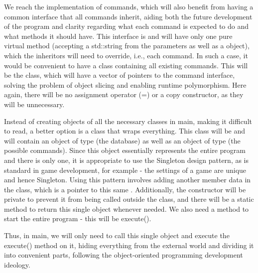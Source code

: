We reach the implementation of commands, which will also benefit from having a common interface that all commands inherit, aiding both the future development of the program and clarity regarding what each command is expected to do and what methods it should have. This interface is  and will have only one pure virtual method (accepting a std\+::string from the parameters as well as a  object), which the inheritors will need to override, i.\+e., each command. In such a case, it would be convenient to have a class containing all existing commands. This will be the  class, which will have a vector of pointers to the command interface, solving the problem of object slicing and enabling runtime polymorphism. Here again, there will be no assignment operator (=) or a copy constructor, as they will be unnecessary.

Instead of creating objects of all the necessary classes in main, making it difficult to read, a better option is a class that wraps everything. This class will be  and will contain an object of type  (the database) as well as an object of type  (the possible commands). Since this object essentially represents the entire program and there is only one, it is appropriate to use the Singleton design pattern, as is standard in game development, for example -\/ the settings of a game are unique and hence Singleton. Using this pattern involves adding another member data in the  class, which is a pointer to this same . Additionally, the constructor will be private to prevent it from being called outside the class, and there will be a static method to return this single  object whenever needed. We also need a method to start the entire program -\/ this will be execute().

Thus, in main, we will only need to call this single  object and execute the execute() method on it, hiding everything from the external world and dividing it into convenient parts, following the object-\/oriented programming development ideology. 